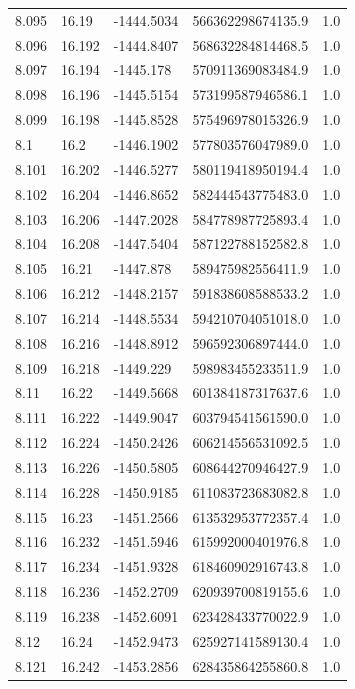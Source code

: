 \begin{tabular}{lllll}
8.095 & 16.19 & -1444.5034 & 566362298674135.9 & 1.0 \\
8.096 & 16.192 & -1444.8407 & 568632284814468.5 & 1.0 \\
8.097 & 16.194 & -1445.178 & 570911369083484.9 & 1.0 \\
8.098 & 16.196 & -1445.5154 & 573199587946586.1 & 1.0 \\
8.099 & 16.198 & -1445.8528 & 575496978015326.9 & 1.0 \\
8.1 & 16.2 & -1446.1902 & 577803576047989.0 & 1.0 \\
8.101 & 16.202 & -1446.5277 & 580119418950194.4 & 1.0 \\
8.102 & 16.204 & -1446.8652 & 582444543775483.0 & 1.0 \\
8.103 & 16.206 & -1447.2028 & 584778987725893.4 & 1.0 \\
8.104 & 16.208 & -1447.5404 & 587122788152582.8 & 1.0 \\
8.105 & 16.21 & -1447.878 & 589475982556411.9 & 1.0 \\
8.106 & 16.212 & -1448.2157 & 591838608588533.2 & 1.0 \\
8.107 & 16.214 & -1448.5534 & 594210704051018.0 & 1.0 \\
8.108 & 16.216 & -1448.8912 & 596592306897444.0 & 1.0 \\
8.109 & 16.218 & -1449.229 & 598983455233511.9 & 1.0 \\
8.11 & 16.22 & -1449.5668 & 601384187317637.6 & 1.0 \\
8.111 & 16.222 & -1449.9047 & 603794541561590.0 & 1.0 \\
8.112 & 16.224 & -1450.2426 & 606214556531092.5 & 1.0 \\
8.113 & 16.226 & -1450.5805 & 608644270946427.9 & 1.0 \\
8.114 & 16.228 & -1450.9185 & 611083723683082.8 & 1.0 \\
8.115 & 16.23 & -1451.2566 & 613532953772357.4 & 1.0 \\
8.116 & 16.232 & -1451.5946 & 615992000401976.8 & 1.0 \\
8.117 & 16.234 & -1451.9328 & 618460902916743.8 & 1.0 \\
8.118 & 16.236 & -1452.2709 & 620939700819155.6 & 1.0 \\
8.119 & 16.238 & -1452.6091 & 623428433770022.9 & 1.0 \\
8.12 & 16.24 & -1452.9473 & 625927141589130.4 & 1.0 \\
8.121 & 16.242 & -1453.2856 & 628435864255860.8 & 1.0 \\

\end{tabular}
